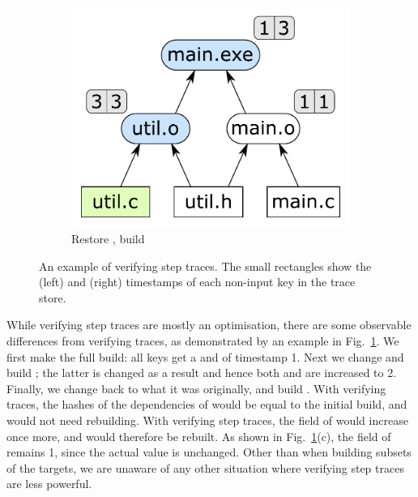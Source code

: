 \begin{figure}
\begin{subfigure}[b]{0.33\linewidth}
\centerline{\includegraphics[scale=0.28]{fig/step-example-step3.pdf}}
\caption{Restore , build }
\end{subfigure}
\caption{An example of verifying step traces. The small rectangles show the
 (left) and  (right) timestamps of each non-input key
in the trace store.
\label{fig-step}}
\end{figure}

While verifying step traces are mostly an optimisation, there are some
observable differences from verifying traces, as demonstrated by an example in
Fig.~\ref{fig-step}. We first make the full build: all keys get a  and
 of timestamp 1. Next we change  and build ;
the latter is changed as a result and hence both  and  are
increased to 2. Finally, we change  back to what it was originally,
and build . With verifying traces, the hashes of the dependencies
of  would be equal to the initial build, and  would
not need rebuilding. With verifying step traces, the  field of
 would increase once more, and  would therefore be
rebuilt. As shown in Fig.~\ref{fig-step}(c), the  field of
 remains 1, since the actual value is unchanged. Other than when
building subsets of the targets, we are unaware of any other situation where
verifying step traces are less powerful.

